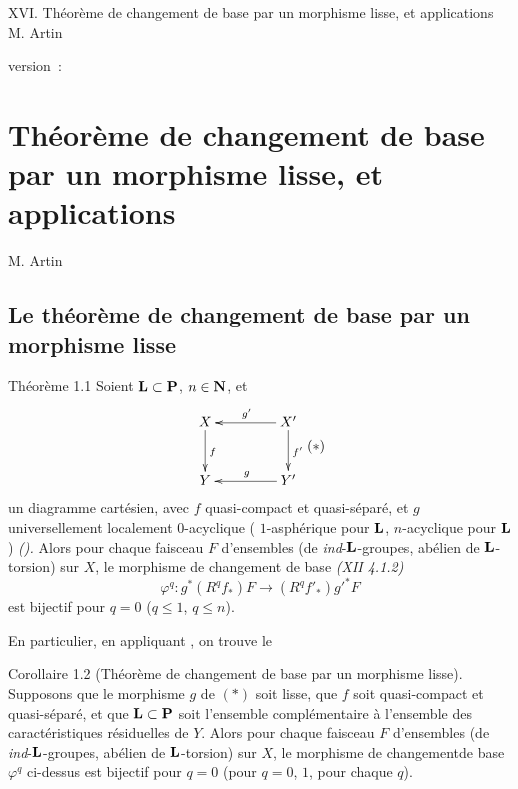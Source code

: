 \documentclass[10pt]{../fichiers-configuration-latex/smfart}
\begin{document}
\begin{center}
XVI. Théorème de changement de base par un morphisme lisse, et applications\\
M. Artin 
\end{center}

version : \showgitstatus{}
\tableofcontents

\else
\chapter{Théorème de changement de base par un morphisme lisse, et applications}
\begin{center}
M. Artin 
\end{center}
\fi

\setcounter{pageoriginal}{206}

\section{Le théorème de changement de base par un morphisme
  lisse}\pageoriginale

\begin{enonce*}{Théorème 1.1}
Soient $\mathbf{L}\subset \mathbf{P}$, $n\in \mathbf{N}$, et
$$\vcenter{
\xymatrix@C=1.5cm@R=1cm{
X   \ar[d]^{f}& X' \ar[l]_{g'} \ar[d]^{f'}\\
Y     & \ar[l]_{g} Y'
}}\leqno{(*)}
$$
un diagramme cartésien, avec $f$ quasi-compact et quasi-séparé, et $g$
universellement localement $0$-acyclique (\resp
{} $1$-asphérique pour $\mathbf{L}$, \resp
{} $n$-acyclique pour $\mathbf{L}$) \emph{().} Alors
pour chaque faisceau $F$ d'ensembles (\resp de
\emph{ind}-$\mathbf{L}$-groupes, \resp abélien de
$\mathbf{L}$-torsion) sur $X$, le morphisme de changement de base
\emph{(XII 4.1.2)}
$$
\varphi^{q}:g^{\ast}(R^{q}f_{\ast})F\longrightarrow
(R^{q}f'_{\ast}){g'}^{\ast}F
$$
est bijectif pour $q=0$ (\resp $q\leq 1$, \resp $q\leq n$).
\end{enonce*}

En particulier, en appliquant , on trouve le

\begin{enonce*}{Corollaire 1.2}
(Théorème de changement de base par un morphisme lisse). Supposons que
  le morphisme $g$ de $(\ast)$ soit lisse, que $f$ soit quasi-compact
  et quasi-séparé, et que $\mathbf{L}\subset \mathbf{P}$ soit
  l'ensemble complémentaire à l'ensemble des caractéristiques
  résiduelles de $Y$. Alors pour chaque faisceau $F$ d'ensembles
  (\resp de \emph{ind}-$\mathbf{L}$-groupes, \resp abélien de
  $\mathbf{L}$-torsion) sur $X$, le morphisme de
  changement\pageoriginale de base $\varphi^{q}$ ci-dessus est
  bijectif pour $q=0$ (\resp pour $q=0$, $1$, \resp pour chaque $q$).
\end{enonce*}
\end{document}

